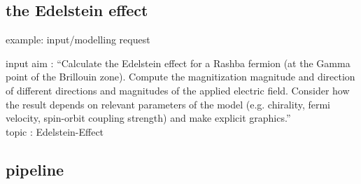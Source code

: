 \documentclass[t,
10pt,
handout, %
]{beamer}
\numberwithin{equation}{section}
\begin{document}
	\subsection{the Edelstein effect}
	\begin{frame}[c]{example: input/modelling request}
		\begin{exampleblock}{input}
			\Large aim : \enquote{Calculate the Edelstein effect for a Rashba fermion (at the Gamma point of the Brillouin zone). Compute the magnitization magnitude and direction of different directions and magnitudes of the applied electric field. Consider how the result depends on relevant parameters of the model (e.g. chirality, fermi velocity, spin-orbit coupling strength) and make explicit graphics.}\\
			\bigskip
			topic : Edelstein-Effect\\
		\end{exampleblock}
	\end{frame}
	
	\subsection{pipeline}
	
\end{document}

